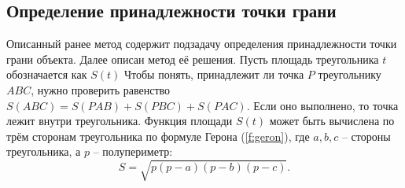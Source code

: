{    \subsection{Определение принадлежности точки грани} {
        Описанный ранее метод содержит подзадачу определения
        принадлежности точки грани объекта.
        Далее описан метод её решения.
        Пусть площадь треугольника $t$ обозначается как $S(t)$
        Чтобы понять, принадлежит ли точка $P$ треугольнику $ABC$,
        нужно проверить равенство $S(ABC) = S(PAB) + S(PBC) + S(PAC)$.
        Если оно выполнено, то точка лежит внутри треугольника.
        Функция площади $S(t)$ может быть вычислена по трём сторонам
        треугольника по формуле Герона (\ref{f:geron}),
        где $a, b, c$ -- стороны треугольника, а $p$ -- полупериметр:
        \begin{equation}
            \label{f:geron}
            S = \sqrt{p(p - a)(p - b)(p - c)}.
        \end{equation}
    }
}

